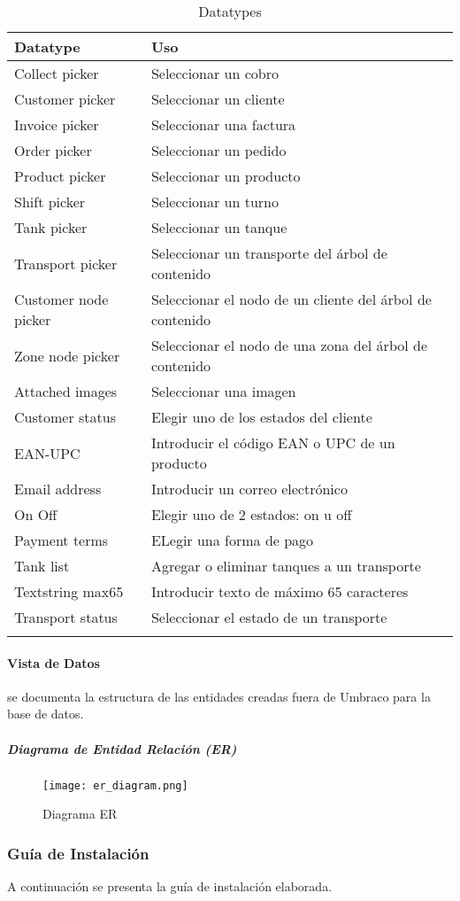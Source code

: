 \begin{longtable}{  l | l  }
    \hline\hline
    \rowcolor{gray!30}
    \textbf{Datatype} & \textbf{Uso} \\
    \hline\hline
    \endhead

    \hline
    \endfoot

    \endlastfoot

    Collect picker & Seleccionar un cobro \\
    Customer picker & Seleccionar un cliente \\
    Invoice picker & Seleccionar una factura \\
    Order picker & Seleccionar un pedido \\
    Product picker & Seleccionar un producto \\
    Shift picker & Seleccionar un turno \\
    Tank picker & Seleccionar un tanque \\
    Transport picker & Seleccionar un transporte del árbol de contenido \\
    Customer node picker & Seleccionar el nodo de un cliente del árbol de contenido \\
    Zone node picker & Seleccionar el nodo de una zona del árbol de contenido \\
    Attached images & Seleccionar una imagen \\
    Customer status & Elegir uno de los estados del cliente \\
    EAN-UPC & Introducir el código EAN o UPC de un producto \\
    Email address & Introducir un correo electrónico \\
    On Off & Elegir uno de 2 estados: on u off \\
    Payment terms & ELegir una forma de pago \\
    Tank list & Agregar o eliminar tanques a un transporte \\
    Textstring max65 & Introducir texto de máximo 65 caracteres \\
    Transport status & Seleccionar el estado de un transporte \\

    \hline

    \caption{Datatypes}
    \label{table:datatypes}
\end{longtable}

\paragraph{Vista de Datos} se documenta la estructura de las entidades creadas fuera de Umbraco para la base de datos.
\subparagraph*{Diagrama de Entidad Relación (ER)}
\begin{figure}[H]
    \centering
    \texttt{[image: er\_diagram.png]}
    \caption{Diagrama ER}
    \label{fig:er_diagram}
\end{figure}

\subsubsection{Guía de Instalación}
A continuación se presenta la guía de instalación elaborada.
